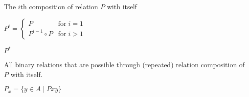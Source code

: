 \begin{description}
        The \(i\)th composition of relation \(P\) with itself

        \begin{math}
            P^i = 
            \begin{cases}
                P               & \text{for} \; i = 1\\
                P^{i-1} \circ P & \text{for} \; i > 1
            \end{cases}
        \end{math}
    
    \item \(P^*\)
    
        All binary relations that are possible through (repeated) relation composition of \(P\) with itself.

        \(P_x = \{ y \in A \mid Pxy \}\)

    
\end{description}